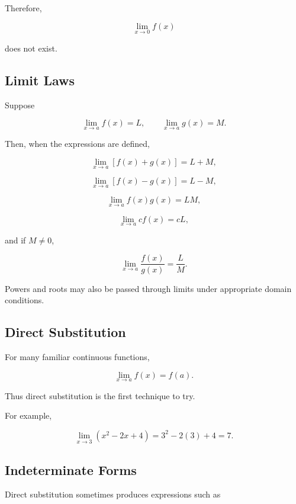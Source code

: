 Therefore,

\[ \lim_{x\to0}f(x) \]

does not exist.

\subsection{Limit Laws}
\label{subsec:limit-laws}

Suppose

\[ \lim_{x\to a}f(x)=L,\qquad
\lim_{x\to a}g(x)=M. \]

Then, when the expressions are defined,

\[ \lim_{x\to a}[f(x)+g(x)]=L+M, \]

\[ \lim_{x\to a}[f(x)-g(x)]=L-M, \]

\[ \lim_{x\to a}f(x)g(x)=LM, \]

\[ \lim_{x\to a}cf(x)=cL, \]

and if \(M\neq0\),

\[ \lim_{x\to a}\frac{f(x)}{g(x)}=\frac{L}{M}. \]

Powers and roots may also be passed through limits under appropriate domain
conditions.

\subsection{Direct Substitution}
\label{subsec:direct-substitution-limits}

For many familiar continuous functions,

\[ \lim_{x\to a}f(x)=f(a). \]

Thus direct substitution is the first technique to try.

For example,

\[ \lim_{x\to3}(x^2-2x+4)
=3^2-2(3)+4=7. \]

\subsection{Indeterminate Forms}
\label{subsec:indeterminate-forms-intro}

Direct substitution sometimes produces expressions such as

